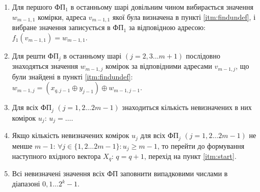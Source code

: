 \documentclass[12pt]{article}
\begin{document}
\begin{enumerate}
\item Для першого ФП$_1$ в останньому шарі довільним чином вибирається значення $w_{m-1,1}$ комірки, адреса $v_{m-1,1}$ якої була визначена в пункті \ref{itm:findundef}, і вибране значення записується в ФП$_1$ за відповідною адресою: $f_1(v_{m-1,1})=w_{m-1,1}$.
\item Для решти ФП$_j$ в останньому шарі $(j=2,3 \ldots m+1)$ послідовно знаходяться значення $w_{m-1,j}$ комірок за відповідними адресами $v_{m-1,j}$, що були знайдені в пункті \ref{itm:findundef}: $w_{m-1,j}=(x_{q,j-1} \oplus y_{j-1}) \oplus w_{m-1,j-1}$.
\item Для всіх ФП$_j$ $(j=1,2 \ldots 2m-1)$ знаходиться кількість невизначених в них комірок $u_j$: $u_j= \ldots$.
\item Якщо кількість невизначених комірок $u_j$ для всіх ФП$_j$ $(j=1,2 \ldots 2m-1)$ не менше $m-1$: $\forall j \in \{1,2 \ldots 2m-1\}: u_j \geq m-1$, то перейти до формування наступного вхідного вектора $X_q$: $q=q+1$, перехід на пункт \ref{itm:start}.
\item Всі невизначені значення всіх ФП заповнити випадковими числами в діапазоні $0,1 \ldots 2^k-1$.
\end{enumerate}
\end{document}
